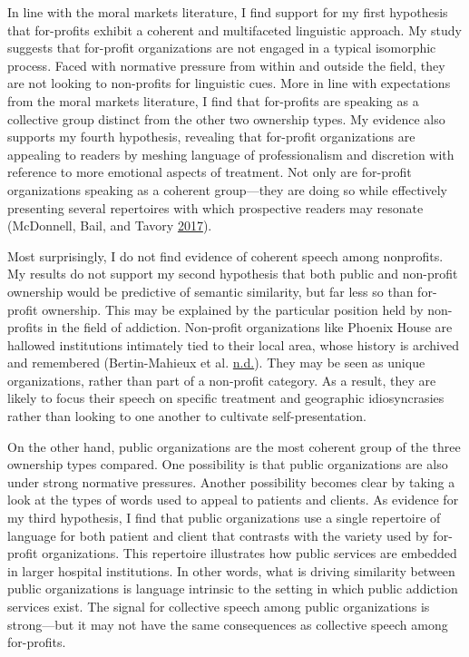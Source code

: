 \documentclass[
  12pt,
]{article}
\begin{document}
\vspace{12pt}

In line with the moral markets literature, I find support for my first hypothesis that for-profits exhibit a coherent and multifaceted linguistic approach. My study suggests that for-profit organizations are not engaged in a typical isomorphic process. Faced with normative pressure from within and outside the field, they are not looking to non-profits for linguistic cues. More in line with expectations from the moral markets literature, I find that for-profits are speaking as a collective group distinct from the other two ownership types. My evidence also supports my fourth hypothesis, revealing that for-profit organizations are appealing to readers by meshing language of professionalism and discretion with reference to more emotional aspects of treatment. Not only are for-profit organizations speaking as a coherent group---they are doing so while effectively presenting several repertoires with which prospective readers may resonate (McDonnell, Bail, and Tavory \protect\hyperlink{ref-mcdonnell2017}{2017}).

\vspace{12pt}

Most surprisingly, I do not find evidence of coherent speech among nonprofits. My results do not support my second hypothesis that both public and non-profit ownership would be predictive of semantic similarity, but far less so than for-profit ownership. This may be explained by the particular position held by non-profits in the field of addiction. Non-profit organizations like Phoenix House are hallowed institutions intimately tied to their local area, whose history is archived and remembered (Bertin-Mahieux et al. \protect\hyperlink{ref-bertin-mahieux}{n.d.}). They may be seen as unique organizations, rather than part of a non-profit category. As a result, they are likely to focus their speech on specific treatment and geographic idiosyncrasies rather than looking to one another to cultivate self-presentation.

\vspace{12pt}

On the other hand, public organizations are the most coherent group of the three ownership types compared. One possibility is that public organizations are also under strong normative pressures. Another possibility becomes clear by taking a look at the types of words used to appeal to patients and clients. As evidence for my third hypothesis, I find that public organizations use a single repertoire of language for both patient and client that contrasts with the variety used by for-profit organizations. This repertoire illustrates how public services are embedded in larger hospital institutions. In other words, what is driving similarity between public organizations is language intrinsic to the setting in which public addiction services exist. The signal for collective speech among public organizations is strong---but it may not have the same consequences as collective speech among for-profits.
\end{document}
